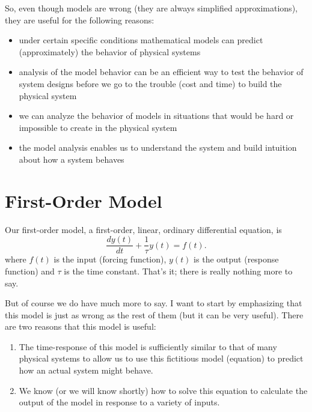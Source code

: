 So, even though models are wrong (they are always simplified approximations), they are useful for the following reasons:
\begin{itemize}
\item under certain specific conditions mathematical models can predict (approximately) the behavior of physical systems
\item analysis of the model behavior can be an efficient way to test the behavior of system designs before we go to the trouble (cost and time) to build the physical system
\item we can analyze the behavior of models in situations that would be hard or impossible to create in the physical system
\item the model analysis enables us to understand the system and build intuition about how a system behaves 
\end{itemize}

\section{First-Order Model}
Our \gls{first-order model}, a first-order, linear, ordinary differential equation, is 
\begin{equation}
\label{e:first}
\frac{dy(t)}{dt} + \frac{1}{\tau}y(t) = f(t).
\end{equation}
where $f(t)$ is the input (forcing function), $y(t)$ is the output (response function) and $\tau$ is the time constant.  That's it; there is really nothing more to say.  

But of course we do have much more to say.  I want to start by emphasizing that this model is just as wrong as the rest of them (but it can be very useful).  There are two reasons that this model is useful:
\begin{enumerate}
\item The time-response of this model is sufficiently similar to that of many physical systems to allow us to use this fictitious model (equation) to predict how an actual system might behave.
\item We know (or we will know shortly) how to solve this equation to calculate the output of the model in response to a variety of inputs.
\end{enumerate}

